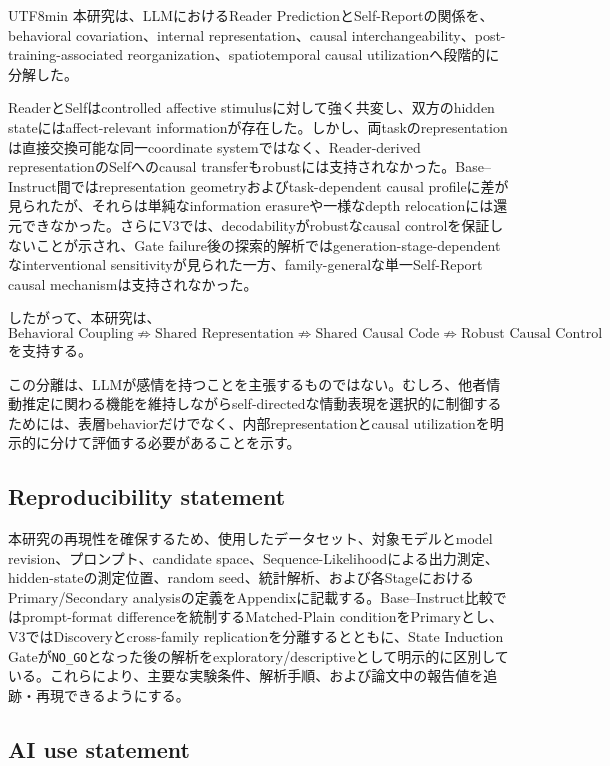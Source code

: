 \documentclass{article} %
\begin{document}
\begin{CJK*}{UTF8}{min}
本研究は、LLMにおけるReader PredictionとSelf-Reportの関係を、behavioral covariation、internal representation、causal interchangeability、post-training-associated reorganization、spatiotemporal causal utilizationへ段階的に分解した。

ReaderとSelfはcontrolled affective stimulusに対して強く共変し、双方のhidden stateにはaffect-relevant informationが存在した。しかし、両taskのrepresentationは直接交換可能な同一coordinate systemではなく、Reader-derived representationのSelfへのcausal transferもrobustには支持されなかった。Base--Instruct間ではrepresentation geometryおよびtask-dependent causal profileに差が見られたが、それらは単純なinformation erasureや一様なdepth relocationには還元できなかった。さらにV3では、decodabilityがrobustなcausal controlを保証しないことが示され、Gate failure後の探索的解析ではgeneration-stage-dependentなinterventional sensitivityが見られた一方、family-generalな単一Self-Report causal mechanismは支持されなかった。

したがって、本研究は、
\[
\text{Behavioral Coupling}
\not\Rightarrow
\text{Shared Representation}
\not\Rightarrow
\text{Shared Causal Code}
\not\Rightarrow
\text{Robust Causal Control}
\]
を支持する。

この分離は、LLMが感情を持つことを主張するものではない。むしろ、他者情動推定に関わる機能を維持しながらself-directedな情動表現を選択的に制御するためには、表層behaviorだけでなく、内部representationとcausal utilizationを明示的に分けて評価する必要があることを示す。

\subsection*{Reproducibility statement}

本研究の再現性を確保するため、使用したデータセット、対象モデルとmodel revision、プロンプト、candidate space、Sequence-Likelihoodによる出力測定、hidden-stateの測定位置、random seed、統計解析、および各StageにおけるPrimary/Secondary analysisの定義をAppendixに記載する。Base--Instruct比較ではprompt-format differenceを統制するMatched-Plain conditionをPrimaryとし、V3ではDiscoveryとcross-family replicationを分離するとともに、State Induction Gateが\texttt{NO\_GO}となった後の解析をexploratory/descriptiveとして明示的に区別している。これらにより、主要な実験条件、解析手順、および論文中の報告値を追跡・再現できるようにする。

\subsection*{AI use statement}


\end{CJK*}
\end{document}

